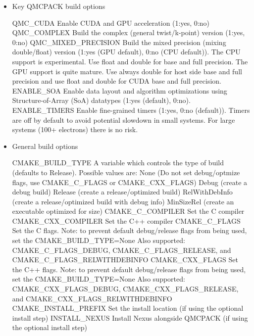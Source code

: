 \begin{itemize}
\item  Key QMCPACK build options
%
\begin{shade}
QMC_CUDA              Enable CUDA and GPU acceleration (1:yes, 0:no)
QMC_COMPLEX           Build the complex (general twist/k-point) version (1:yes, 0:no)
QMC_MIXED_PRECISION   Build the mixed precision (mixing double/float) version
                      (1:yes (GPU default), 0:no (CPU default)).
                      The CPU support is experimental.
                      Use float and double for base and full precision.
                      The GPU support is quite mature.
                      Use always double for host side base and full precision
                      and use float and double for CUDA base and full precision.
ENABLE_SOA            Enable data layout and algorithm optimizations using  
                      Structure-of-Array (SoA) datatypes (1:yes (default), 0:no).  
ENABLE_TIMERS         Enable fine-grained timers (1:yes, 0:no (default)).
                      Timers are off by default to avoid potential slowdown in small
                      systems. For large systems (100+ electrons) there is no risk.
\end{shade}

\item General build options
%
\begin{shade}
CMAKE_BUILD_TYPE     A variable which controls the type of build
                     (defaults to Release). Possible values are:
                     None (Do not set debug/optmize flags, use
                     CMAKE_C_FLAGS or CMAKE_CXX_FLAGS)
                     Debug (create a debug build)
                     Release (create a release/optimized build)
                     RelWithDebInfo (create a release/optimized build with debug info)
                     MinSizeRel (create an executable optimized for size)
CMAKE_C_COMPILER     Set the C compiler
CMAKE_CXX_COMPILER   Set the C++ compiler
CMAKE_C_FLAGS        Set the C flags.  Note: to prevent default
                     debug/release flags from being used, set the CMAKE_BUILD_TYPE=None
                     Also supported: CMAKE_C_FLAGS_DEBUG,
                     CMAKE_C_FLAGS_RELEASE, and CMAKE_C_FLAGS_RELWITHDEBINFO
CMAKE_CXX_FLAGS      Set the C++ flags.  Note: to prevent default
                     debug/release flags from being used, set the CMAKE_BUILD_TYPE=None
                     Also supported: CMAKE_CXX_FLAGS_DEBUG,
                     CMAKE_CXX_FLAGS_RELEASE, and CMAKE_CXX_FLAGS_RELWITHDEBINFO
CMAKE_INSTALL_PREFIX Set the install location (if using the optional install step)
INSTALL_NEXUS        Install Nexus alongside QMCPACK (if using the optional install step)
\end{shade}


\end{itemize}
